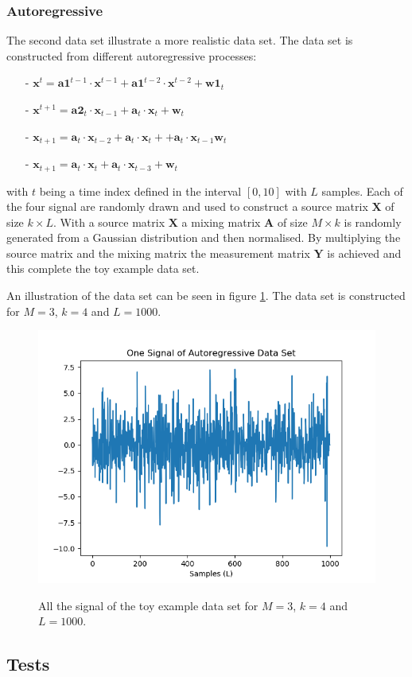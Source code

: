 \subsubsection{Autoregressive}
The second data set illustrate a more realistic data set.
The data set is constructed from different autoregressive processes: 
\begin{itemize}
\item[-] $\mathbf{x}^{t} = \mathbf{a1}^{t-1} \cdot \mathbf{x}^{t-1} + \mathbf{a1}^{t-2} \cdot \mathbf{x}^{t-2} + \mathbf{w1}_t$
\item[-] $\mathbf{x}^{t+1} = \mathbf{a2}_t \cdot \mathbf{x}_{t-1} + \mathbf{a}_t \cdot \mathbf{x}_t + \mathbf{w}_t$
\item[-] $\mathbf{x}_{t+1} = \mathbf{a}_t \cdot \mathbf{x}_{t-2} + \mathbf{a}_t \cdot \mathbf{x}_t + + \mathbf{a}_t \cdot \mathbf{x}_{t-1} \mathbf{w}_t$
\item[-] $\mathbf{x}_{t+1} = \mathbf{a}_t \cdot \mathbf{x}_t + \mathbf{a}_t \cdot \mathbf{x}_{t-3} + \mathbf{w}_t$
\end{itemize}
with $t$ being a time index defined in the interval $[0,10]$ with $L$ samples. Each of the four signal are randomly drawn and used to construct a source matrix $\mathbf{X}$ of size $k \times L$. 
With a source matrix $\mathbf{X}$ a mixing matrix $\mathbf{A}$ of size $M \times k$ is randomly generated from a Gaussian distribution and then normalised. By multiplying the source matrix and the mixing matrix the measurement matrix $\mathbf{Y}$ is achieved and this complete the toy example data set.

An illustration of the data set can be seen in figure \ref{fig:mix}. The data set is constructed for $M = 3$, $k = 4$ and $L = 1000$.
\begin{figure}[H]
\centering
\includegraphics[scale=0.5]{figures/chapter6/AR_Data_m3_n4_k4_L1000.png}
\label{fig:mix}
\caption{All the signal of the toy example data set for $M = 3$, $k=4$ and $L=1000$.}
\end{figure}
\noindent



\subsection{Tests}